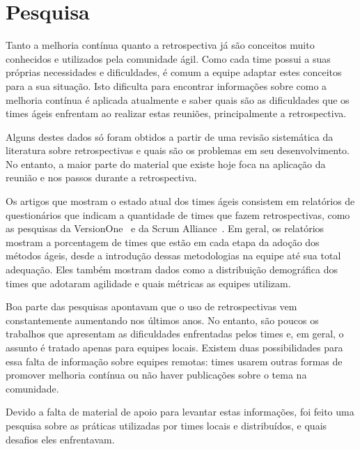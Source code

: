 \section{Pesquisa}

Tanto a melhoria contínua quanto a retrospectiva já são conceitos muito conhecidos e utilizados pela comunidade ágil. Como cada time possui a suas próprias necessidades e dificuldades, é comum a equipe adaptar estes conceitos para a sua situação. Isto dificulta para encontrar informações sobre como a melhoria contínua é aplicada atualmente e saber quais são as dificuldades que os times ágeis enfrentam ao realizar estas reuniões, principalmente a retrospectiva. 

Alguns destes dados só foram obtidos a partir de uma revisão sistemática da literatura sobre retrospectivas e quais são os problemas em seu desenvolvimento. No entanto, a maior parte do material que existe hoje foca na aplicação da reunião e nos passos durante a retrospectiva.

Os artigos que mostram o estado atual dos times ágeis consistem em relatórios de questionários que indicam a quantidade de times que fazem retrospectivas, como as pesquisas da VersionOne~\cite{versionOne} e da Scrum Alliance~\cite{scrumAlliance}. Em geral, os relatórios mostram a porcentagem de times que estão em cada etapa da adoção dos métodos ágeis, desde a introdução dessas metodologias na equipe até sua total adequação. Eles também mostram dados como a distribuição demográfica dos times que adotaram agilidade e quais métricas as equipes utilizam.

Boa parte das pesquisas apontavam que o uso de retrospectivas vem constantemente aumentando nos últimos anos. No entanto, são poucos os trabalhos que apresentam as dificuldades enfrentadas pelos times e, em geral, o assunto é tratado apenas para equipes locais. Existem duas possibilidades para essa falta de informação sobre equipes remotas: times usarem outras formas de promover melhoria contínua ou não haver publicações sobre o tema na comunidade.

Devido a falta de material de apoio para levantar estas informações, foi feito uma pesquisa sobre as práticas utilizadas por times locais e distribuídos, e quais desafios eles enfrentavam.


